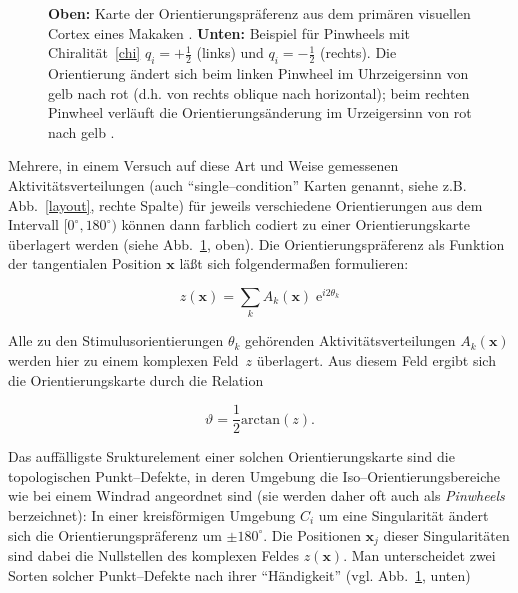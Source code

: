 \begin{figure}[t]
\begin{center}
\begin{minipage}{10cm}
\end{minipage}
\vskip0.5cm
\begin{minipage}[b]{4cm}
\end{minipage}
\end{center}
\caption{\textbf{Oben:} Karte der Orientierungspräferenz aus dem primären
visuellen Cortex eines Makaken \protect{}.
\textbf{Unten:} Beispiel für Pinwheels mit Chiralität~\eqref{chi}
$q_i=+\frac{1}{2}$ (links) und $q_i=-\frac{1}{2}$ (rechts). Die
Orientierung ändert sich beim linken Pinwheel im Uhrzeigersinn von gelb
nach rot (d.h. von rechts oblique nach horizontal); beim rechten Pinwheel
verläuft die Orientierungsänderung im Urzeigersinn von rot nach gelb
\protect{}.}
\label{opblasdel}
\end{figure}

Mehrere, in einem Versuch auf diese Art und Weise gemessenen
Aktivitäts\-ver\-tei\-lungen (auch ``single--condition'' Karten genannt, siehe
z.B. Abb.~\ref{layout}, rechte Spalte) für jeweils verschiedene
Orientierungen aus dem Intervall $[0^\circ,180^\circ)$ können dann
farblich codiert zu einer Orientierungskarte überlagert werden (siehe
Abb.~\ref{opblasdel}, oben).  Die Orientierungspräferenz als Funktion der
tangentialen Position $\mathbf{x}$ läßt sich folgendermaßen formulieren:

\begin{equation*}
z(\mathbf{x})=\sum\limits_k A_k(\mathbf{x})\; \text{e}^{i2\theta_k}
\label{zfeld}
\end{equation*}

Alle zu den Stimulusorientierungen $\theta_k$ gehörenden
Aktivitätsverteilungen $A_k(\mathbf{x})$ werden hier zu einem komplexen
Feld~$z$ überlagert.  Aus diesem Feld ergibt sich die Orientierungskarte
durch die Relation

\begin{equation*}
\vartheta=\frac{1}{2}\text{arctan}(z).
\end{equation*}

Das auffälligste Srukturelement einer solchen Orientierungskarte sind die
topologischen Punkt--Defekte, in deren Umgebung die
Iso--Orientierungsbereiche wie bei einem Windrad angeordnet sind (sie
werden daher oft auch als \emph{Pinwheels} berzeichnet): In einer
kreisförmigen Umgebung $C_i$ um eine Singularität ändert sich die
Orientierungspräferenz um $\pm 180^\circ$.  Die Positionen $\mathbf{x}_j$
dieser Singularitäten sind dabei die Nullstellen des komplexen Feldes
$z(\mathbf{x})$. Man unterscheidet zwei Sorten solcher Punkt--Defekte nach
ihrer ``Händigkeit'' (vgl. Abb.~\ref{opblasdel}, unten)

